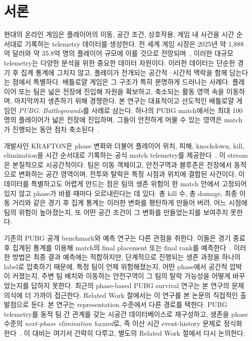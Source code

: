 \section{서론}

현대의 온라인 게임은 플레이어의 이동, 공간 조건, 상호작용, 게임 내 사건을 시간 순서대로 기록하는 telemetry 데이터를 생성한다. 전 세계 게임 시장은 2025년 약 1,888억 달러와 약 35.8억 명의 플레이어 규모에 이를 것으로 전망되며~\cite{newzoo2025globalgames}, 이러한 대규모 telemetry는 다양한 분석을 위한 중요한 데이터 자원이다. 이러한 데이터는 단순한 경기 후 집계 통계에 그치지 않고, 플레이가 전개되는 공간적·시간적 맥락을 함께 담는다는 점에서 특별하다. 배틀로얄 게임은 그 구조가 특히 분명하게 드러나는 사례다. 플레이어 또는 팀은 넓은 전장에 진입해 자원을 확보하고, 축소되는 활동 영역 속을 이동하며, 마지막까지 생존하기 위해 경쟁한다.
본 연구는 대표적이고 선도적인 배틀로얄 게임인 \textit{PUBG: Battlegrounds}를 사례로 삼는다. 하나의 PUBG match에서는 최대 100명의 플레이어가 넓은 전장에 진입하며, 그들이 안전하게 머물 수 있는 영역은 match가 진행되는 동안 점차 축소된다~\cite{pubgGameInfo}.

개발사인 KRAFTON은 phase 변화와 더불어 플레이어 위치, 피해, knockdown, kill, elimination을 시간 순서대로 기록하는 공식 match telemetry를 제공한다~\cite{pubgTelemetryEvents}. 이 stream은 본질적으로 시공간적이다. 팀은 이동 객체이고, 안전구역과 블루존은 전장에서 동적으로 변화하는 공간 영역이며, 전투와 탈락은 특정 시점과 위치에 결합된 사건이다. 이 데이터를 특별하고도 어렵게 만드는 점은 팀의 생존 위험이 한 match 안에서 고정되어 있지 않고 phase가 바뀔 때마다 오르내린다는 데 있다. 총 kill 수, 총 damage, 최종 이동 거리와 같은 경기 후 집계 통계는 이러한 변화를 평탄하게 만들어 버려, 어느 시점에 팀의 위험이 높아졌는지, 또 어떤 공간 조건이 그 변화를 만들었는지를 보여주지 못한다.

기존의 PUBG 공개 benchmark와 예측 연구는 다른 관점을 취한다. 이들은 경기 종료 후 집계된 통계를 이용해 match의 final placement 또는 final rank를 예측한다~\cite{kagglePubgFinishPlacement,sen2021pubgFinalRank,lee2025pubgRank}. 이러한 방법은 최종 결과 예측에는 적합하지만, 단계적으로 진행되는 생존 과정을 하나의 label로 압축하기 때문에, 특정 팀이 언제 위험해졌는지, 어떤 phase에서 공간적 압박이 커졌는지, 주변 팀 배치와 이동하는 안전구역이 그 팀의 탈락 가능성을 어떻게 바꾸었는지를 답하지 못한다. 최근의 phase-based PUBG survival 연구는 본 연구의 문제의식에 더 가까이 접근한다. Related Work 절에서는 이 연구를 본 논문의 직접적인 출발점으로 둔다. 본 연구는 representation 수준에서 다른 경로를 택한다. PUBG telemetry를 동적 팀 간 관계를 갖는 시공간 데이터베이스로 재구성하고, 생존을 phase 수준의 \textit{next-phase elimination hazard}로, 즉 이산 시간 event-history 문제로 정식화한다~\cite{allison1982discrete,singer1993discrete}. 이 대비는 여기서 간략히 다루고, 별도의 Related Work 절에서 다시 논의한다.

